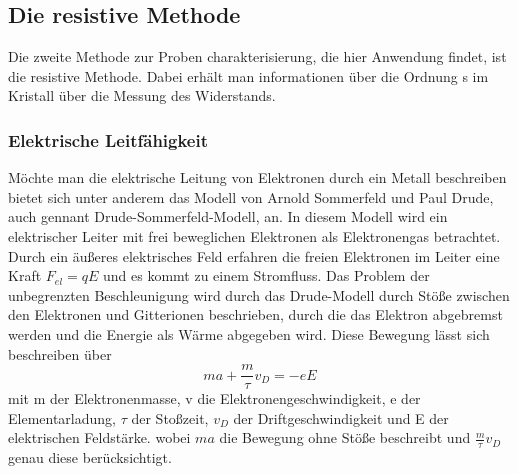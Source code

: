     
    \subsection{Die resistive Methode}
        Die zweite Methode zur Proben charakterisierung, die hier Anwendung findet, ist die resistive Methode.
        Dabei erhält man informationen über die Ordnung s im Kristall über die Messung des Widerstands.
        \subsubsection{Elektrische Leitfähigkeit}
            Möchte man die elektrische Leitung von Elektronen durch ein Metall beschreiben bietet sich unter
            anderem das Modell von Arnold Sommerfeld und Paul Drude, auch gennant Drude-Sommerfeld-Modell, an. In diesem Modell
            wird ein elektrischer Leiter mit frei beweglichen Elektronen als Elektronengas betrachtet.
            Durch ein äußeres elektrisches Feld erfahren die freien Elektronen im Leiter eine Kraft $F_{el} = qE$
            und es kommt zu einem Stromfluss. Das Problem der unbegrenzten Beschleunigung wird durch das Drude-Modell
            durch Stöße zwischen den Elektronen und Gitterionen beschrieben, durch die das Elektron abgebremst werden
            und die Energie als Wärme abgegeben wird. Diese Bewegung lässt sich beschreiben über
            \begin{equation}
                ma + \frac{m}{\tau}v_D = -eE
            \end{equation}  
            mit m der Elektronenmasse, v die Elektronengeschwindigkeit, e der Elementarladung, $\tau$ der Stoßzeit, $v_D$ der Driftgeschwindigkeit und E der elektrischen Feldstärke.
            wobei $ma$ die Bewegung ohne Stöße beschreibt und $\frac{m}{\tau}v_D$ genau diese berücksichtigt.
